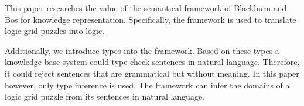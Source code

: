 This paper researches the value of the semantical framework of Blackburn and Bos for knowledge representation. Specifically, the framework is used to translate logic grid puzzles into logic. %

Additionally, we introduce types into the framework. Based on these types a knowledge base system could type check sentences in natural language. Therefore, it could reject sentences that are grammatical but without meaning. In this paper however, only type inference is used. The framework can infer the domains of a logic grid puzzle from its sentences in natural language.

